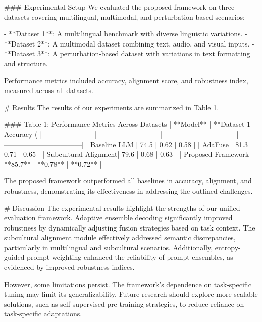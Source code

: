 ### Experimental Setup  
We evaluated the proposed framework on three datasets covering multilingual, multimodal, and perturbation-based scenarios:

- **Dataset 1**: A multilingual benchmark with diverse linguistic variations.
- **Dataset 2**: A multimodal dataset combining text, audio, and visual inputs.
- **Dataset 3**: A perturbation-based dataset with variations in text formatting and structure.

Performance metrics included accuracy, alignment score, and robustness index, measured across all datasets.

# Results  
The results of our experiments are summarized in Table 1.  

### Table 1: Performance Metrics Across Datasets  
| **Model**            | **Dataset 1 Accuracy (%
|-----------------------|---------------------------|--------------------------------|---------------------------------|  
| Baseline LLM         | 74.5                      | 0.62                           | 0.58                            |  
| AdaFuse              | 81.3                      | 0.71                           | 0.65                            |  
| Subcultural Alignment| 79.6                      | 0.68                           | 0.63                            |  
| Proposed Framework   | **85.7**                  | **0.78**                       | **0.72**                        |  

The proposed framework outperformed all baselines in accuracy, alignment, and robustness, demonstrating its effectiveness in addressing the outlined challenges.

# Discussion  
The experimental results highlight the strengths of our unified evaluation framework. Adaptive ensemble decoding significantly improved robustness by dynamically adjusting fusion strategies based on task context. The subcultural alignment module effectively addressed semantic discrepancies, particularly in multilingual and subcultural scenarios. Additionally, entropy-guided prompt weighting enhanced the reliability of prompt ensembles, as evidenced by improved robustness indices.

However, some limitations persist. The framework's dependence on task-specific tuning may limit its generalizability. Future research should explore more scalable solutions, such as self-supervised pre-training strategies, to reduce reliance on task-specific adaptations.

